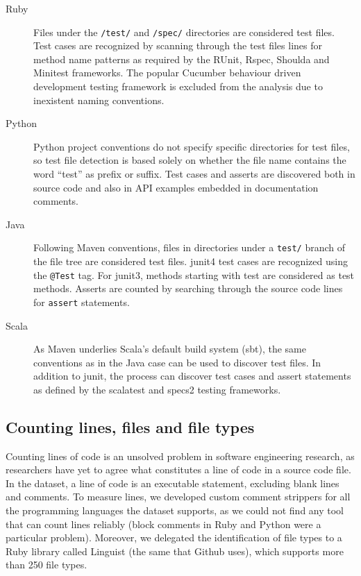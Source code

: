 \documentclass{sig-alternate}
\begin{document}
\begin{description}

  \item[Ruby] Files under the \texttt{/test/} and \texttt{/spec/} directories
    are considered test files. Test cases are recognized by scanning through the
    test files lines for method name patterns as required by the \textsf{RUnit},
    \textsf{Rspec}, \textsf{Shoulda} and \textsf{Minitest} frameworks. The
    popular Cucumber behaviour driven development testing framework is excluded
    from the analysis due to inexistent naming conventions.

  \item[Python] Python project conventions do not specify specific directories
    for test files, so test file detection is based solely on whether the
    file name contains the word ``test'' as prefix or suffix. Test cases
    and asserts are discovered both in source code and also in API examples
    embedded in documentation comments.

  \item[Java] Following Maven conventions, files in directories under a
    \texttt{test/} branch of the file tree are considered test files.
    \textsf{junit4} test cases are recognized using the \texttt{@Test} tag. For
    \textsf{junit3}, methods starting with test are considered as test methods.
    Asserts are counted by searching through the source code lines for
    \texttt{assert} statements.

  \item[Scala] As Maven underlies Scala's default build system (\textsf{sbt}),
    the same conventions as in the Java case can be used to discover test files.
    In addition to \textsf{junit}, the process can discover test cases and
    assert statements as defined by the \textsf{scalatest} and
    \textsf{specs2} testing frameworks.

\end{description}

\subsection{Counting lines, files and file types}

Counting lines of code is an unsolved problem in software engineering research,
as researchers have yet to agree what constitutes a line of code in a source
code file. In the \pullreqs dataset, a line of code is an executable statement,
excluding blank lines and comments. To measure lines, we developed custom
comment strippers for all the programming languages the dataset supports, as
we could not find any tool that can count lines reliably (block comments in Ruby and Python were a particular problem).
Moreover, we delegated the identification of file types to a Ruby library
called Linguist (the same that Github uses), which supports more than 250 file types.
\end{document}
